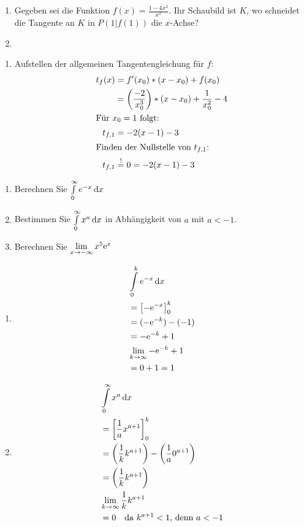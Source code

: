   \begin{enumerate}
    \item Gegeben sei die Funktion $f(x) = \frac{1-4x^2}{x^2}$. Ihr Schaubild ist $K$, wo schneidet die Tangente an $K$ in $P(1|f(1))$ die $x$-Achse?
		\item
  \end{enumerate}
	\begin{lsg}{}
		\begin{enumerate}
			\item Aufstellen der allgemeinen Tangentengleichung für $f$:
			\begin{align*}
				t_f(x)&=f'(x_0)*(x-x_0)+f(x_0)\\
							&=\left(\frac{-2}{x_0^3}\right)*(x-x_0)+\frac{1}{x_0^2}-4\\
				\intertext{Für $x_0=1$ folgt:}
				t_{f,1}&=-2(x-1)-3\\
				\intertext{Finden der Nullstelle von $t_{f,1}$:}
				t_{f,1}&\overset!=0=-2(x-1)-3\\
			\end{align*}
		\end{enumerate}
	\end{lsg}



	\begin{enumerate}
		\item Berechnen Sie $\int\limits^\infty_0 e^{-x}\,\mathrm{d} x$
		\item	Bestimmen Sie $\int\limits^\infty_0 x^a\,\mathrm{d} x$ in Abhängigkeit von $a$ mit $a < -1$.
		\item Berechnen Sie $\lim\limits_{x\rightarrow -\infty} x^5\mathrm{e}^x$
	\end{enumerate}
	\begin{lsg}{}
		\begin{enumerate}
			\item \begin{align*}
				&\int\limits^k_0 e^{-x}\,\mathrm{d} x\\
				&=\left[-\mathrm{e}^{-x}\right]_0^k\\
				&=(-\mathrm{e}^{-k})-(-1)\\
				&=-\mathrm{e}^{-k}+1\\
				&\lim\limits_{k\rightarrow \infty}-\mathrm{e}^{-k}+1\\
				&=0+1=1
			\end{align*}
			\item \begin{align*}
				&\int\limits^\infty_0 x^a\,\mathrm{d} x\\
				&=\left[\frac1 a x^{a+1}\right]_0^k\\
				&=\left(\frac1 k k^{a+1}\right)-\left(\frac1 a 0^{a+1}\right)\\
				&=\left(\frac1 k k^{a+1}\right)\\
				&\lim\limits_{k\rightarrow \infty}\frac1 k k^{a+1}\\
				&=0\quad \text{da $k^{a+1}<1$, denn $a<-1$}
			\end{align*}
		\end{enumerate}
	\end{lsg}



